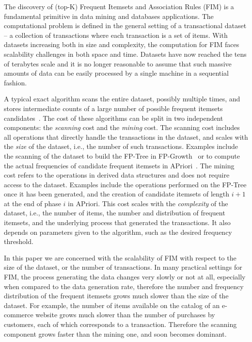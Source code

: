 The discovery of (top-K) Frequent Itemsets and Association Rules (FIM)
is a fundamental primitive in data mining and databases applications. The
computational problem is defined in the general setting of a transactional dataset
-- a collection of transactions where each transaction is a set of items.
With datasets increasing both in size and complexity, the computation
for FIM faces scalability challenges in both space and time. Datasets have
now reached the tens of terabytes scale and it is no longer reasonable to assume
that such massive amounts of data can be easily processed by a single machine
in a sequential fashion. 

A typical exact algorithm scans the entire dataset,
possibly multiple times, and stores intermediate counts of a large number of
possible frequent itemsets candidates~\citep{AgrawalS94,HanPY00}. The cost of
these algorithms can be split in two independent components:
the \emph{scanning} cost and the \emph{mining} cost. The scanning cost includes
all operations that directly handle the transactions in the dataset, and scales
with the \emph{size} of the dataset, i.e., the number of such transactions. Examples
include the scanning of the dataset to build the FP-Tree in
FP-Growth~\citep{HanPY00} or to compute the actual frequencies of candidate
frequent itemsets in APriori~\citep{AgrawalIS93}.  The mining cost refers to the
operations in derived data structures and does not require access to the
dataset. Examples include the operations performed on the FP-Tree once it has
been generated, and the creation of candidate itemsets of length $i+1$ at the
end of phase $i$ in APriori.  This cost scales with the \emph{complexity} of the
dataset, i.e., the number of items, the number and distribution of frequent
itemsets, and the underlying process that generated the transactions. It also
depends on parameters given to the algorithm, such as the desired frequency
threshold.

In this paper we are concerned with the scalability of FIM with respect to
the size of the dataset, or the number of transactions. 
In many practical settings for FIM, the process generating the data changes very
slowly or not at all, especially when compared to the data generation rate,
therefore the number and frequency distribution of the frequent itemsets grows
much slower than the size of the dataset. For example, the number of items
available on the catalog of an e-commerce website grows much slower than the
number of purchases by customers, each of which corresponds to a transaction.
Therefore the scanning component grows faster than the mining one, and soon
becomes dominant. 

